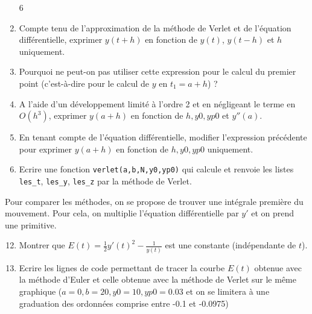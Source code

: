 \begin{enumerate}\setcounter{enumi}6\item Compte tenu de l'approximation de la méthode de Verlet et de l'équation différentielle, exprimer $y(t+h)$ en fonction de $y(t)$, $y(t-h)$ et $h$ uniquement.
	
	\item  Pourquoi ne peut-on pas utiliser cette expression pour le calcul du premier point (c'est-à-dire pour le calcul de $y$ en $t_1=a+h$) ?
	
	\item A l'aide d'un développement limité à l'ordre 2 et en négligeant le terme en $O(h^3)$, exprimer $y(a+h)$ en fonction de $h, y0, yp0$ et $y''(a)$.
	
	\item En tenant compte de l'équation différentielle, modifier l'expression précédente pour exprimer $y(a+h)$ en fonction de $h, y0, yp0$ uniquement.
	
	\item  Ecrire une fonction \texttt{verlet(a,b,N,y0,yp0)} qui calcule et renvoie les listes \texttt{les\_t}, \texttt{les\_y}, \texttt{les\_z} par la méthode de Verlet.
	
\end{enumerate}

\bigskip Pour comparer les méthodes, on se propose de trouver une intégrale première du mouvement. Pour cela, on multiplie l'équation différentielle par $y'$ et on prend une primitive.

\begin{enumerate}\setcounter{enumi}{11}\item  Montrer que $E(t)=\displaystyle\frac 12 y'(t)^2-\displaystyle\frac 1{y(t)}$ est une constante (indépendante de $t$).
	
	\item Ecrire les lignes de code permettant de tracer la courbe $E(t)$ obtenue avec la méthode d'Euler et celle obtenue avec la méthode de Verlet sur le même graphique ($a=0, b=20, y0=10, yp0=0.03$ et on se limitera à une graduation des ordonnées comprise entre -0.1 et -0.0975) 
	
\end{enumerate}



